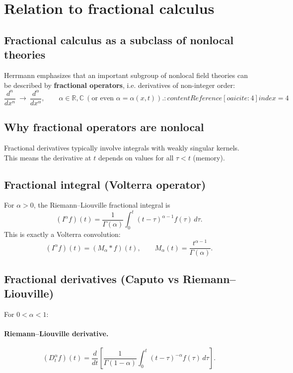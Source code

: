 
\section{Relation to fractional calculus}

\subsection{Fractional calculus as a subclass of nonlocal theories}
Herrmann emphasizes that an important subgroup of nonlocal field theories can be described
by \textbf{fractional operators}, i.e. derivatives of non-integer order:
\begin{equation}
\frac{d^n}{dx^n}\ \longrightarrow\ \frac{d^\alpha}{dx^\alpha},
\qquad \alpha\in\mathbb{R},\mathbb{C}\ (\text{or even }\alpha=\alpha(x,t)). :contentReference[oaicite:4]{index=4}
\end{equation}

\subsection{Why fractional operators are nonlocal}
Fractional derivatives typically involve integrals with weakly singular kernels.
This means the derivative at $t$ depends on values for all $\tau<t$ (memory).

\subsection{Fractional integral (Volterra operator)}
For $\alpha>0$, the Riemann--Liouville fractional integral is
\begin{equation}
(I^\alpha f)(t)
=
\frac{1}{\Gamma(\alpha)}
\int_0^t (t-\tau)^{\alpha-1}f(\tau)\,d\tau.
\end{equation}
This is exactly a Volterra convolution:
\[
(I^\alpha f)(t) = (M_\alpha * f)(t),
\qquad
M_\alpha(t)=\frac{t^{\alpha-1}}{\Gamma(\alpha)}.
\]

\subsection{Fractional derivatives (Caputo vs Riemann--Liouville)}
For $0<\alpha<1$:

\paragraph{Riemann--Liouville derivative.}
\begin{equation}
(D_t^\alpha f)(t)
=
\frac{d}{dt}
\left[
\frac{1}{\Gamma(1-\alpha)}
\int_0^t (t-\tau)^{-\alpha}f(\tau)\,d\tau
\right].
\end{equation}

